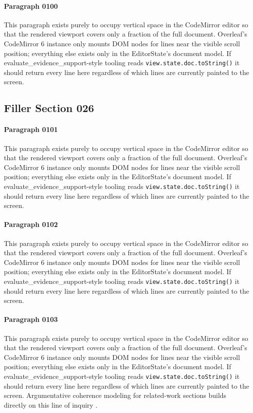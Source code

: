 \documentclass{article}
\begin{document}
\paragraph{Paragraph 0100}
This paragraph exists purely to occupy vertical space in the CodeMirror editor so that the rendered viewport covers only a fraction of the full document. Overleaf's CodeMirror 6 instance only mounts DOM nodes for lines near the visible scroll position; everything else exists only in the EditorState's document model. If evaluate\_evidence\_support-style tooling reads \texttt{view.state.doc.toString()} it should return every line here regardless of which lines are currently painted to the screen.

\subsection{Filler Section 026}
\paragraph{Paragraph 0101}
This paragraph exists purely to occupy vertical space in the CodeMirror editor so that the rendered viewport covers only a fraction of the full document. Overleaf's CodeMirror 6 instance only mounts DOM nodes for lines near the visible scroll position; everything else exists only in the EditorState's document model. If evaluate\_evidence\_support-style tooling reads \texttt{view.state.doc.toString()} it should return every line here regardless of which lines are currently painted to the screen.

\paragraph{Paragraph 0102}
This paragraph exists purely to occupy vertical space in the CodeMirror editor so that the rendered viewport covers only a fraction of the full document. Overleaf's CodeMirror 6 instance only mounts DOM nodes for lines near the visible scroll position; everything else exists only in the EditorState's document model. If evaluate\_evidence\_support-style tooling reads \texttt{view.state.doc.toString()} it should return every line here regardless of which lines are currently painted to the screen.

\paragraph{Paragraph 0103}
This paragraph exists purely to occupy vertical space in the CodeMirror editor so that the rendered viewport covers only a fraction of the full document. Overleaf's CodeMirror 6 instance only mounts DOM nodes for lines near the visible scroll position; everything else exists only in the EditorState's document model. If evaluate\_evidence\_support-style tooling reads \texttt{view.state.doc.toString()} it should return every line here regardless of which lines are currently painted to the screen. Argumentative coherence modeling for related-work sections builds directly on this line of inquiry \citep{diaz2017coherence}.
\end{document}

